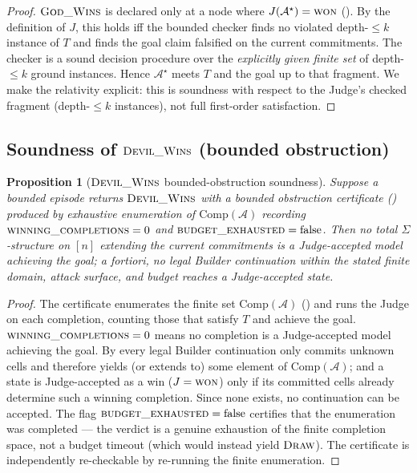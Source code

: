\documentclass[11pt]{article}
\theoremstyle{definition}
\theoremstyle{plain}
\newtheorem{proposition}[definition]{Proposition}
\newcommand{\Sig}{\Sigma}
\newcommand{\Thy}{T}
\newcommand{\Struct}{\mathcal{A}}
\begin{document}
\begin{proof}
$\textsc{God\_Wins}$ is declared only at a node where $J(\Struct^\star)=\textsc{won}$
(). By the definition of $J$, this holds iff the bounded checker finds no
violated depth-$\le k$ instance of $\Thy$ and finds the goal claim falsified on the current commitments.
The checker is a sound decision procedure over the \emph{explicitly given finite set} of depth-$\le k$
ground instances. Hence $\Struct^\star$ meets $\Thy$ and the goal up to that fragment. We make the
relativity explicit: this is soundness with respect to the Judge's checked fragment (depth-$\le k$
instances), not full first-order satisfaction.
\end{proof}

\subsection{Soundness of $\textsc{Devil\_Wins}$ (bounded obstruction)}

\begin{proposition}[$\textsc{Devil\_Wins}$ bounded-obstruction soundness]\label{prop:devilsound}
Suppose a bounded episode returns $\textsc{Devil\_Wins}$ with a bounded obstruction certificate
() produced by exhaustive enumeration of $\mathrm{Comp}(\Struct)$ recording
$\textsc{winning\_completions}=0$ and $\textsc{budget\_exhausted}=\mathrm{false}$. Then no total
$\Sig$-structure on $[n]$ extending the current commitments is a Judge-accepted model achieving the goal;
a fortiori, no legal Builder continuation within the stated finite domain, attack surface, and budget
reaches a Judge-accepted state.
\end{proposition}

\begin{proof}
The certificate enumerates the finite set $\mathrm{Comp}(\Struct)$ () and runs the
Judge on each completion, counting those that satisfy $\Thy$ and achieve the goal. $\textsc{winning\_%
completions}=0$ means no completion is a Judge-accepted model achieving the goal. By 
every legal Builder continuation only commits unknown cells and therefore yields (or extends to) some
element of $\mathrm{Comp}(\Struct)$; and a state is Judge-accepted as a win ($J=\textsc{won}$) only if its
committed cells already determine such a winning completion. Since none exists, no continuation can be
accepted. The flag $\textsc{budget\_exhausted}=\mathrm{false}$ certifies that the enumeration was
completed --- the verdict is a genuine exhaustion of the finite completion space, not a budget timeout
(which would instead yield $\textsc{Draw}$). The certificate is independently re-checkable by re-running
the finite enumeration.
\end{proof}
\end{document}

